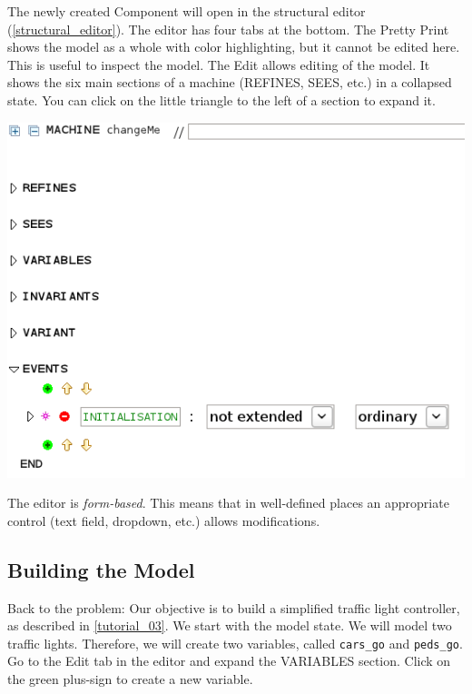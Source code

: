 The newly created Component will open in the structural editor (\ref{structural_editor}).  The editor has four tabs at the bottom.  The \textsf{Pretty Print} shows the model as a whole with color highlighting, but it cannot be edited here.  This is useful to inspect the model.  The \textsf{Edit} allows editing of the model.  It shows the six main sections of a machine (REFINES, SEES, etc.) in a collapsed state.  You can click on the little triangle to the left of a section to expand it.
\begin{center}
	\includegraphics[]{img/tutorial/tut_3_interface.png}
\end{center}
The editor is \textit{form-based}.  This means that in well-defined places an appropriate control (text field, dropdown, etc.) allows modifications.



\subsection{Building the Model}

Back to the problem: Our objective is to build a simplified traffic light controller, as described in \ref{tutorial_03}.  We start with the model state.  We will model two traffic lights.  Therefore, we will create two variables, called \texttt{cars\_go} and \texttt{peds\_go}.  Go to the \textsf{Edit} tab in the editor and expand the \textsf{VARIABLES} section.  Click on the green plus-sign to create a new variable.

